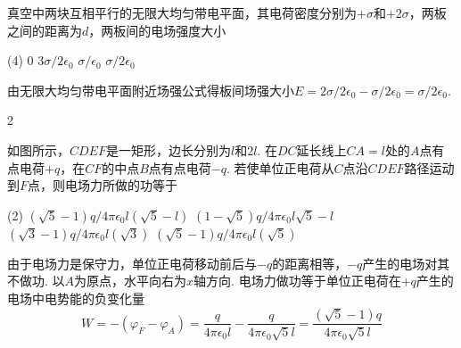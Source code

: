 \begin{problem}
    真空中两块互相平行的无限大均匀带电平面，其电荷密度分别为$+\sigma$和$+2\sigma$，两板之间的距离为$d$，两板间的电场强度大小
    \begin{tasks}(4)
        \task $0$
        \task $3\sigma/2\epsilon_0$
        \task $\sigma/\epsilon_0$
        \task $\sigma/2\epsilon_0$
    \end{tasks}
\end{problem}
\begin{solution}
    由无限大均匀带电平面附近场强公式得板间场强大小$E=2\sigma/2\epsilon_0-\sigma/2\epsilon_0=\sigma/2\epsilon_0$.
\end{solution}

\begin{paracol}{2}
\begin{problem}
    如图所示，$CDEF$是一矩形，边长分别为$l$和$2l$. 在$DC$延长线上$CA=l$处的$A$点有点电荷$+q$，在$CF$的中点$B$点有点电荷$-q$. 若使单位正电荷从$C$点沿$CDEF$路径运动到$F$点，则电场力所做的功等于
    \begin{tasks}(2)
        \task $(\sqrt5-1)q/4\pi\epsilon_0l(\sqrt5-l)$
        \task $(1-\sqrt5)q/4\pi\epsilon_0l\sqrt5-l$
        \task $(\sqrt3-1)q/4\pi\epsilon_0l(\sqrt3)$
        \task $(\sqrt5-1)q/4\pi\epsilon_0l(\sqrt5)$
    \end{tasks}
    \switchcolumn\centering
\end{problem}
\end{paracol}
\begin{solution}
    由于电场力是保守力，单位正电荷移动前后与$-q$的距离相等，$-q$产生的电场对其不做功. 以$A$为原点，水平向右为$x$轴方向. 电场力做功等于单位正电荷在$+q$产生的电场中电势能的负变化量
    \[W=-(\varphi_F-\varphi_A)=\frac{q}{4\pi\epsilon_0l}-\frac{q}{4\pi\epsilon_0\sqrt5l}=\frac{(\sqrt5-1)q}{4\pi\epsilon_0\sqrt5l}\]
\end{solution}

